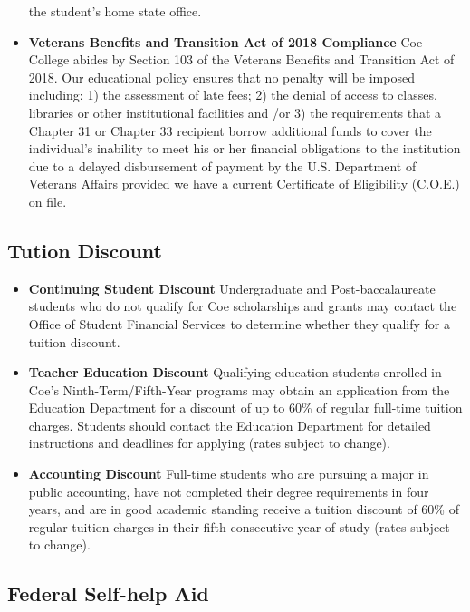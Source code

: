 \documentclass[
  letterpaper,
]{scrbook}
\begin{document}
\begin{itemize}
  the student's home state office.
\item
  \textbf{Veterans Benefits and Transition Act of 2018 Compliance} Coe
  College abides by Section 103 of the Veterans Benefits and Transition
  Act of 2018. Our educational policy ensures that no penalty will be
  imposed including: 1) the assessment of late fees; 2) the denial of
  access to classes, libraries or other institutional facilities and /or
  3) the requirements that a Chapter 31 or Chapter 33 recipient borrow
  additional funds to cover the individual's inability to meet his or
  her financial obligations to the institution due to a delayed
  disbursement of payment by the U.S. Department of Veterans Affairs
  provided we have a current Certificate of Eligibility (C.O.E.) on
  file.
\end{itemize}

\subsection{Tution Discount}\label{tution-discount}

\begin{itemize}
\item
  \textbf{Continuing Student Discount} Undergraduate and
  Post-baccalaureate students who do not qualify for Coe scholarships
  and grants may contact the Office of Student Financial Services to
  determine whether they qualify for a tuition discount.
\item
  \textbf{Teacher Education Discount} Qualifying education students
  enrolled in Coe's Ninth-Term/Fifth-Year programs may obtain an
  application from the Education Department for a discount of up to 60\%
  of regular full-time tuition charges. Students should contact the
  Education Department for detailed instructions and deadlines for
  applying (rates subject to change).
\item
  \textbf{Accounting Discount} Full-time students who are pursuing a
  major in public accounting, have not completed their degree
  requirements in four years, and are in good academic standing receive
  a tuition discount of 60\% of regular tuition charges in their fifth
  consecutive year of study (rates subject to change).
\end{itemize}

\subsection{Federal Self-help Aid}\label{federal-self-help-aid}
\end{document}
